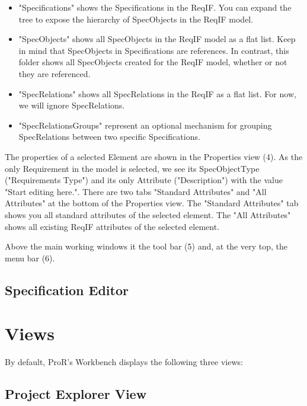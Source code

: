 \begin{itemize}

\item
  "Specifications" shows the Specifications in the ReqIF.  You can
  expand the tree to expose the hierarchy of SpecObjects in the
  ReqIF model.
\item
  "SpecObjects" shows all SpecObjects in the ReqIF model as a flat list.
  Keep in mind that SpecObjects in Specifications are references.  In
  contrast, this folder shows all SpecObjects created for the ReqIF model, whether or not they are referenced.
\item
  "SpecRelations" shows all SpecRelations in the ReqIF as a flat list.
  For now, we will ignore SpecRelations.
\item
  "SpecRelationsGroups" represent an optional mechanism for grouping SpecRelations between two specific Specifications.
\end{itemize}

The properties of a selected Element are shown in the Properties view
(4).  As the only Requirement in the model is selected, we see its
SpecObjectType ("Requirements Type") and its only Attribute
("Description") with the value "Start editing here.".  There are two
tabs "Standard Attributes" and "All Attributes" at the bottom of the
Properties view.  \marginpar{*****} The "Standard Attributes" tab shows you all standard
attributes of the selected element.  The "All Attributes" shows all
existing ReqIF attributes of the selected element.

Above the main working windows it the tool bar (5) and, at the very top, the menu bar (6).
\subsection{Specification Editor}

\section{Views}

By default, ProR's Workbench displays the following three views:

\subsection{Project Explorer View}

